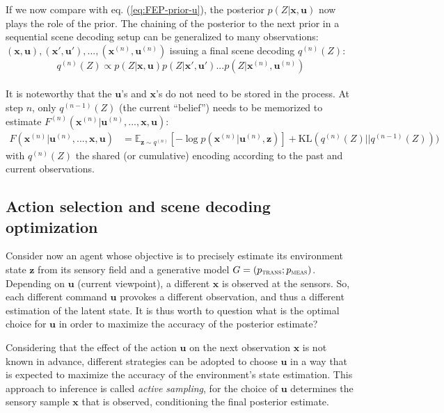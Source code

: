 \documentclass[12pt,twoside,openright]{article}
\begin{document}
If we now compare with eq. (\ref{eq:FEP-prior-u}), the posterior $p(Z|\boldsymbol{x},\boldsymbol{u})$ now plays the role of the prior. 
The chaining of the posterior to the next prior in a sequential scene decoding setup can be generalized to many observations: $(\boldsymbol{x},\boldsymbol{u}), (\boldsymbol{x}',\boldsymbol{u}'), ... , (\boldsymbol{x}^{(n)},\boldsymbol{u}^{(n)})$ issuing a final scene decoding $q^{(n)}(Z)$:
$$ q^{(n)}(Z) \propto p(Z|\boldsymbol{x},\boldsymbol{u}) p(Z|\boldsymbol{x}',\boldsymbol{u}') ... p(Z|\boldsymbol{x}^{(n)},\boldsymbol{u}^{(n)}) $$\\
It is noteworthy that the $\boldsymbol{u}$'s and $\boldsymbol{x}$'s do not need to be stored in the process. At step $n$, only $q^{(n-1)}(Z)$ (the current ``belief'') needs to be memorized to estimate $F^{(n)}(\boldsymbol{x}^{(n)}|\boldsymbol{u}^{(n)}, ..., \boldsymbol{x}, \boldsymbol{u})$:
\begin{align}
F(\boldsymbol{x}^{(n)}|\boldsymbol{u}^{(n)}, ...,  \boldsymbol{x}, \boldsymbol{u}) 
&= \mathbb{E}_{\boldsymbol{z} \sim q^{(n)}} \left[-\log p(\boldsymbol{x}^{(n)}| \boldsymbol{u}^{(n)}, \boldsymbol{z})\right] + \text{KL}(q^{(n)}(Z)||q^{(n-1)}(Z)))
\label{eq:FEP-uxun}
\end{align}
with $q^{(n)}(Z)$ the shared (or cumulative) encoding according to the past and current observations.


\subsection{Action selection and scene decoding optimization}
Consider now an agent whose objective is to precisely estimate its environment state $\boldsymbol{z}$ from its sensory field and a generative model $G = (p_\text{\sc trans}; p_\text{\sc meas})$.
Depending on $\boldsymbol{u}$ (current viewpoint), a different $\boldsymbol{x}$ is observed at the sensors. So, each different command $\boldsymbol{u}$ provokes a different observation, and thus a different 
estimation of the latent state. It is thus worth to question what is the optimal choice for $\boldsymbol{u}$ in order to maximize the accuracy of the posterior estimate?

Considering that the effect of the action $\boldsymbol{u}$ on the next observation $\boldsymbol{x}$ is not known in advance, different strategies can be adopted to choose $\boldsymbol{u}$ in a way that is expected to maximize the accuracy of the environment's state estimation. This approach to inference is called \emph{active sampling}, for the choice of $\boldsymbol{u}$ determines the sensory sample $\boldsymbol{x}$ that is observed, conditioning the final posterior estimate.
\end{document}
